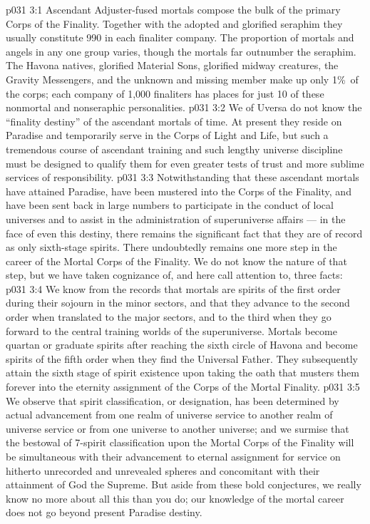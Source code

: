 \vs p031 3:1 Ascendant Adjuster\hyp{}fused mortals compose the bulk of the primary Corps of the Finality. Together with the adopted and glorified seraphim they usually constitute 990 in each finaliter company. The proportion of mortals and angels in any one group varies, though the mortals far outnumber the seraphim. The Havona natives, glorified Material Sons, glorified midway creatures, the Gravity Messengers, and the unknown and missing member make up only 1\%\ of the corps; each company of 1,000 finaliters has places for just 10 of these nonmortal and nonseraphic personalities.
\vs p031 3:2 We of Uversa do not know the “finality destiny” of the ascendant mortals of time. At present they reside on Paradise and temporarily serve in the Corps of Light and Life, but such a tremendous course of ascendant training and such lengthy universe discipline must be designed to qualify them for even greater tests of trust and more sublime services of responsibility.
\vs p031 3:3 \pc Notwithstanding that these ascendant mortals have attained Paradise, have been mustered into the Corps of the Finality, and have been sent back in large numbers to participate in the conduct of local universes and to assist in the administration of superuniverse affairs --- in the face of even this  destiny, there remains the significant fact that they are of record as only sixth\hyp{}stage spirits. There undoubtedly remains one more step in the career of the Mortal Corps of the Finality. We do not know the nature of that step, but we have taken cognizance of, and here call attention to, three facts:
\vs p031 3:4 \bibnobreakspace We know from the records that mortals are spirits of the first order during their sojourn in the minor sectors, and that they advance to the second order when translated to the major sectors, and to the third when they go forward to the central training worlds of the superuniverse. Mortals become quartan or graduate spirits after reaching the sixth circle of Havona and become spirits of the fifth order when they find the Universal Father. They subsequently attain the sixth stage of spirit existence upon taking the oath that musters them forever into the eternity assignment of the Corps of the Mortal Finality.
\vs p031 3:5 We observe that spirit classification, or designation, has been determined by actual advancement from one realm of universe service to another realm of universe service or from one universe to another universe; and we surmise that the bestowal of 7\hyp{}spirit classification upon the Mortal Corps of the Finality will be simultaneous with their advancement to eternal assignment for service on hitherto unrecorded and unrevealed spheres and concomitant with their attainment of God the Supreme. But aside from these bold conjectures, we really know no more about all this than you do; our knowledge of the mortal career does not go beyond present Paradise destiny.
